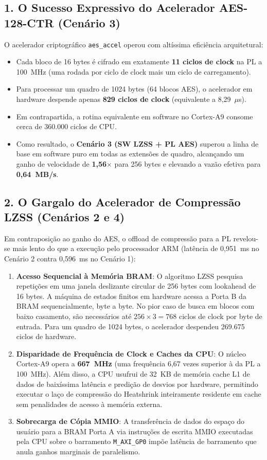 \documentclass[11pt,a4paper]{article}
\begin{document}
\subsection{1. O Sucesso Expressivo do Acelerador AES-128-CTR (Cenário 3)}
O acelerador criptográfico \texttt{aes\_accel} operou com altíssima eficiência arquitetural:
\begin{itemize}
  \item Cada bloco de 16 bytes é cifrado em exatamente \textbf{11 ciclos de clock} na PL a 100~MHz (uma rodada por ciclo de clock mais um ciclo de carregamento).
  \item Para processar um quadro de 1024 bytes (64 blocos AES), o acelerador em hardware despende apenas \textbf{829 ciclos de clock} (equivalente a 8,29~$\mu$s).
  \item Em contrapartida, a rotina equivalente em software no Cortex-A9 consome cerca de 360.000 ciclos de CPU.
  \item Como resultado, o \textbf{Cenário 3 (SW LZSS + PL AES)} superou a linha de base em software puro em todas as extensões de quadro, alcançando um ganho de velocidade de \textbf{1,56$\times$} para 256 bytes e elevando a vazão efetiva para \textbf{0,64~MB/s}.
\end{itemize}

\subsection{2. O Gargalo do Acelerador de Compressão LZSS (Cenários 2 e 4)}
Em contraposição ao ganho do AES, o offload de compressão para a PL revelou-se mais lento do que a execução pelo processador ARM (latência de 0,951~ms no Cenário 2 contra 0,596~ms no Cenário 1):
\begin{enumerate}
  \item \textbf{Acesso Sequencial à Memória BRAM}: O algoritmo LZSS pesquisa repetições em uma janela deslizante circular de 256 bytes com lookahead de 16 bytes. A máquina de estados finitos em hardware acessa a Porta B da BRAM sequencialmente, byte a byte. No pior caso de busca em blocos com baixo casamento, são necessários até $256 \times 3 = 768$ ciclos de clock por byte de entrada. Para um quadro de 1024 bytes, o acelerador despendeu 269.675 ciclos de hardware.
  \item \textbf{Disparidade de Frequência de Clock e Caches da CPU}: O núcleo Cortex-A9 opera a \textbf{667~MHz} (uma frequência 6,67 vezes superior à da PL a 100~MHz). Além disso, a CPU usufrui de 32~KB de memória cache L1 de dados de baixíssima latência e predição de desvios por hardware, permitindo executar o laço de compressão do Heatshrink inteiramente residente em cache sem penalidades de acesso à memória externa.
  \item \textbf{Sobrecarga de Cópia MMIO}: A transferência de dados do espaço do usuário para a BRAM Porta A via instruções de escrita MMIO executadas pela CPU sobre o barramento \texttt{M\_AXI\_GP0} impõe latência de barramento que anula ganhos marginais de paralelismo.
\end{enumerate}
\end{document}
